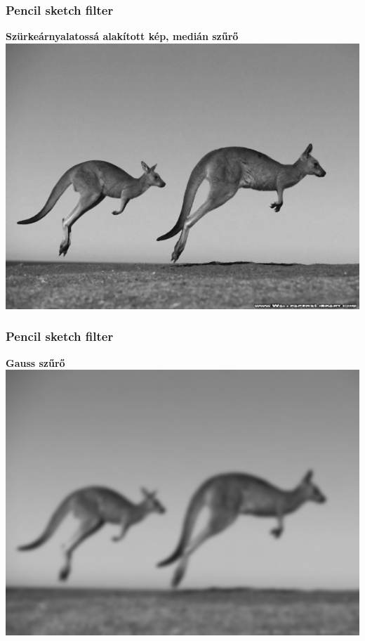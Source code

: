 \documentclass{beamer}
\begin{document}
\begin{frame}[fragile]
\frametitle{Pencil sketch filter}
\begin{center}
\textbf{Szürkeárnyalatossá alakított kép, medián szűrő}
\includegraphics[scale=0.42]{kepek/pencil_sketch/mediangray.jpg}
\end{center}
\end{frame}

\begin{frame}[fragile]
\frametitle{Pencil sketch filter}
\begin{center}
\textbf{Gauss szűrő}
\includegraphics[scale=0.42]{kepek/pencil_sketch/gauss.jpg}
\end{center}
\end{frame}
\end{document}
